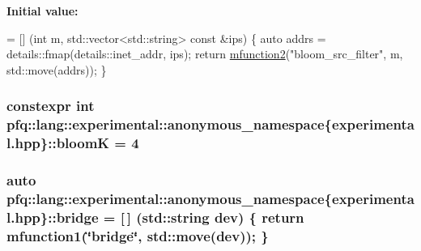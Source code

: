 {\bfseries Initial value\+:}
\begin{DoxyCode}
= [] (\textcolor{keywordtype}{int} m, std::vector<std::string> \textcolor{keyword}{const} &ips) \{
                                    \textcolor{keyword}{auto} addrs = details::fmap(details::inet\_addr, ips);
                                    \textcolor{keywordflow}{return} \hyperlink{namespacepfq_1_1lang_aab1a000712bb2711044255ca1626cc84}{mfunction2}(\textcolor{stringliteral}{"bloom\_src\_filter"}, m, std::move(addrs));
                                \}
\end{DoxyCode}
\hypertarget{namespacepfq_1_1lang_1_1experimental_1_1anonymous__namespace_02experimental_8hpp_03_ac1b8ebb18517de3143349d95a02f4b86}{
\subsubsection[{bloom\+K}]{\setlength{\rightskip}{0pt plus 5cm}constexpr int pfq\+::lang\+::experimental\+::anonymous\+\_\+namespace\{experimental.\+hpp\}\+::bloom\+K = 4}}\label{namespacepfq_1_1lang_1_1experimental_1_1anonymous__namespace_02experimental_8hpp_03_ac1b8ebb18517de3143349d95a02f4b86}
\hypertarget{namespacepfq_1_1lang_1_1experimental_1_1anonymous__namespace_02experimental_8hpp_03_a03fc8960a5fbbe59f000bd9c5a74b7fe}{
\subsubsection[{bridge}]{\setlength{\rightskip}{0pt plus 5cm}auto pfq\+::lang\+::experimental\+::anonymous\+\_\+namespace\{experimental.\+hpp\}\+::bridge = \mbox{[}$\,$\mbox{]} (std\+::string dev) \{ return {\bf mfunction1}(\char`\"{}bridge\char`\"{}, std\+::move(dev)); \}}}\label{namespacepfq_1_1lang_1_1experimental_1_1anonymous__namespace_02experimental_8hpp_03_a03fc8960a5fbbe59f000bd9c5a74b7fe}
